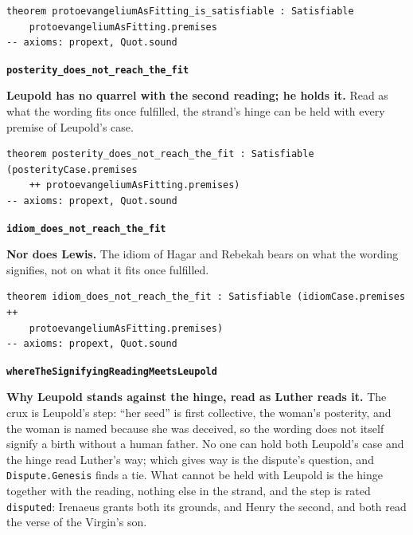 \documentclass[11pt]{article}
\begin{document}
{\small\begin{verbatim}
theorem protoevangeliumAsFitting_is_satisfiable : Satisfiable
    protoevangeliumAsFitting.premises
-- axioms: propext, Quot.sound
\end{verbatim}}
\par\medskip\noindent\textbf{\texttt{posterity\_\allowbreak{}does\_\allowbreak{}not\_\allowbreak{}reach\_\allowbreak{}the\_\allowbreak{}fit}}\par\nobreak\noindent
\textbf{Leupold has no quarrel with the second reading; he holds it.} Read as what the wording fits once fulfilled, the strand’s hinge can be held with every premise of Leupold’s case.

{\small\begin{verbatim}
theorem posterity_does_not_reach_the_fit : Satisfiable (posterityCase.premises
    ++ protoevangeliumAsFitting.premises)
-- axioms: propext, Quot.sound
\end{verbatim}}
\par\medskip\noindent\textbf{\texttt{idiom\_\allowbreak{}does\_\allowbreak{}not\_\allowbreak{}reach\_\allowbreak{}the\_\allowbreak{}fit}}\par\nobreak\noindent
\textbf{Nor does Lewis.} The idiom of Hagar and Rebekah bears on what the wording signifies, not on what it fits once fulfilled.

{\small\begin{verbatim}
theorem idiom_does_not_reach_the_fit : Satisfiable (idiomCase.premises ++
    protoevangeliumAsFitting.premises)
-- axioms: propext, Quot.sound
\end{verbatim}}
\par\medskip\noindent\textbf{\texttt{where\allowbreak{}The\allowbreak{}Signifying\allowbreak{}Reading\allowbreak{}Meets\allowbreak{}Leupold}}\par\nobreak\noindent
\textbf{Why Leupold stands against the hinge, read as Luther reads it.} The crux is Leupold’s step: “her seed” is first collective, the woman’s posterity, and the woman is named because she was deceived, so the wording does not itself signify a birth without a human father. No one can hold both Leupold’s case and the hinge read Luther’s way; which gives way is the dispute’s question, and \texttt{Dispute.Genesis} finds a tie. What cannot be held with Leupold is the hinge together with the reading, nothing else in the strand, and the step is rated \texttt{disputed}: Irenaeus grants both its grounds, and Henry the second, and both read the verse of the Virgin’s son.
\end{document}

